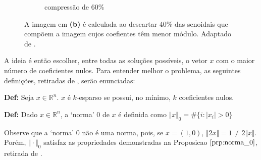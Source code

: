 {\begin{figure}
\begin{center}
\begin{subfigure}[b]{1\textwidth}
        \caption{compressão de $60\%$}
    \end{subfigure}
    \caption[]{A imagem em {\bf (b)} é calculada ao descartar $40\%$ das senoidais que compõem a imagem cujos coefientes têm menor módulo. Adaptado de \protect \footnotemark .}
     \label{fig:coeficientes_altos}
\end{center}
\end{figure}
}

A ideia é então escolher, entre todas as soluções possíveis, o vetor $x$ com o maior número de coeficientes nulos. Para entender melhor o problema, as seguintes definições, retiradas de \cite{ddek}, serão enunciadas:

\textbf{Def:} Seja $x \in \mathbb{R}^n$. $x$ é $k$-esparso se possui, no mínimo, $k$ coeficientes nulos.

\textbf{Def:} Dado $x \in \mathbb{R}^n$, a `norma' $0$ de $x$ é definida como
$\Vert x \Vert_{0} = \# \lbrace i : \vert x_i \vert > 0 \rbrace$

Observe que a `norma' 0 não é uma norma, pois, se $x = (1, 0)$, $\Vert 2x \Vert = 1 \neq 2 \Vert x \Vert$. Porém, $\Vert \cdot \Vert_0$ satisfaz as propriedades demonstradas na Proposicao $\ref{prp:norma_0}$, retirada de \cite{ddek}.

